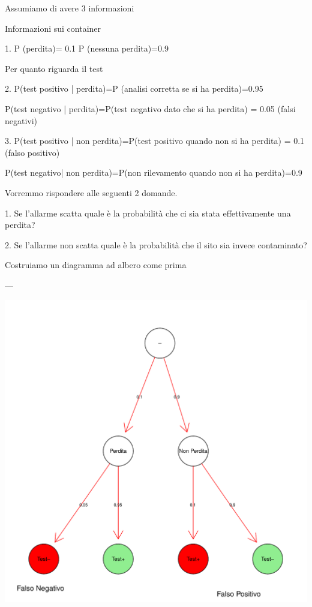 \documentclass[onecolumn,12pt]{book}\usepackage[]{graphicx}\usepackage[]{color}
\makeatletter
\def\maxwidth{ %
  \ifdim\Gin@nat@width>\linewidth
    \linewidth
  \else
    \Gin@nat@width
  \fi
}
\newenvironment{knitrout}{}{} %
\makeatother
\begin{document}
Assumiamo di avere 3 informazioni

Informazioni sui container

1.   P (perdita)= 0.1    
     P (nessuna perdita)=0.9

Per quanto riguarda il test

2.   P(test positivo | perdita)=P (analisi corretta se si ha perdita)=0.95

     P(test negativo | perdita)=P(test negativo dato che  si ha perdita) =  0.05  (falsi negativi)

3.   P(test positivo | non perdita)=P(test positivo quando non si ha perdita) =    0.1  (falso positivo)
      
      P(test negativo| non perdita)=P(non rilevamento quando non si ha perdita)=0.9
      

Vorremmo rispondere alle seguenti 2 domande.

1.  Se l'allarme scatta quale è la probabilità che ci sia stata effettivamente una perdita?

2.  Se l'allarme non scatta quale è la probabilità che il sito sia invece contaminato?

Costruiamo un diagramma ad albero come prima

---



\begin{knitrout}
\color{fgcolor}
\includegraphics[width=\maxwidth]{figure/unnamed-chunk-21-1} 

\end{knitrout}
\end{document}
